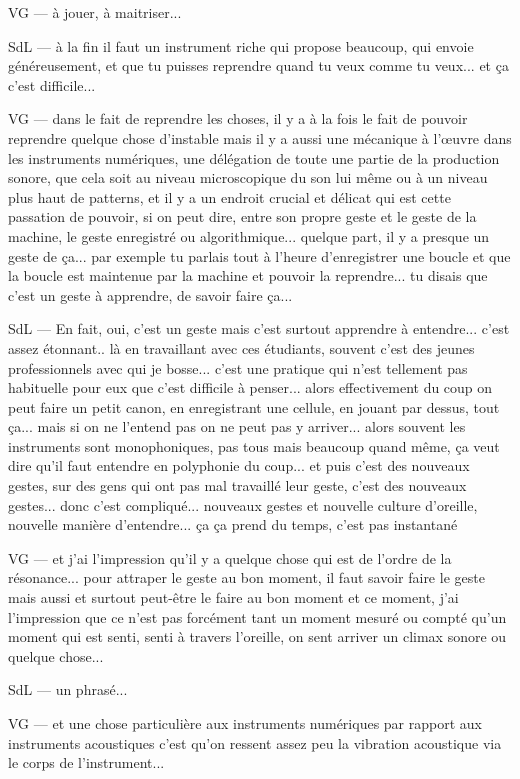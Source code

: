 VG — à jouer, à maitriser... 

SdL — à la fin il faut un instrument riche qui propose beaucoup, qui envoie généreusement, et que tu puisses reprendre quand tu veux comme tu veux... et ça c'est difficile... 

VG — dans le fait de reprendre les choses, il y a à la fois le fait de pouvoir reprendre quelque chose d'instable mais il y a aussi une mécanique à l'œuvre dans les instruments numériques, une délégation de toute une partie de la production sonore, que cela soit au niveau microscopique du son lui même ou à un niveau plus haut de patterns, et il y a un endroit crucial et délicat qui est cette passation de pouvoir, si on peut dire, entre son propre geste et le geste de la machine, le geste enregistré ou algorithmique... quelque part, il y a presque un geste de ça... par exemple tu parlais tout à l'heure d'enregistrer une boucle et que la boucle est maintenue par la machine et pouvoir la reprendre... tu disais que c'est un geste à apprendre, de savoir faire ça... 

SdL — En fait, oui, c'est un geste mais c'est surtout apprendre à entendre... c'est assez étonnant.. là en travaillant avec ces étudiants, souvent c'est des jeunes professionnels avec qui je bosse... c'est une pratique qui n'est tellement pas habituelle pour eux que c'est difficile à penser... alors effectivement du coup on peut faire un petit canon, en enregistrant une cellule, en jouant par dessus, tout ça... mais si on ne l'entend pas on ne peut pas y arriver... alors souvent les instruments sont monophoniques, pas tous mais beaucoup quand même, ça veut dire qu'il faut entendre en polyphonie du coup... et puis c'est des nouveaux gestes, sur des gens qui ont pas mal travaillé leur geste, c'est des nouveaux gestes... donc c'est compliqué... nouveaux gestes et nouvelle culture d'oreille, nouvelle manière d'entendre... ça ça prend du temps, c'est pas instantané 

VG — et j'ai l'impression qu'il y a quelque chose qui est de l'ordre de la résonance... pour attraper le geste au bon moment, il faut savoir faire le geste mais aussi et surtout peut-être le faire au bon moment et ce moment, j'ai l'impression que ce n'est pas forcément tant un moment mesuré ou compté qu'un moment qui est senti, senti à travers l'oreille, on sent arriver un climax sonore ou quelque chose... 

SdL — un phrasé... 

VG — et une chose particulière aux instruments numériques par rapport aux instruments acoustiques c'est qu'on ressent assez peu la vibration acoustique via le corps de l'instrument... 

